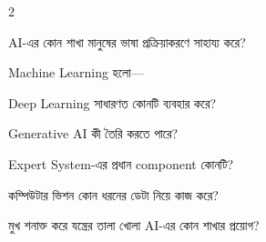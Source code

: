 \begin{topicbody}
\begin{multicols}{2}
\begin{compactenum}
\item \begin{minipage}[t]{\linewidth}AI-এর কোন শাখা মানুষের ভাষা প্রক্রিয়াকরণে সাহায্য করে?\par {}\par\end{minipage}

\item \begin{minipage}[t]{\linewidth}Machine Learning হলো—\par {}\par\end{minipage}

\item \begin{minipage}[t]{\linewidth}Deep Learning সাধারণত কোনটি ব্যবহার করে?\par {}\par\end{minipage}

\item \begin{minipage}[t]{\linewidth}Generative AI কী তৈরি করতে পারে?\par {}\par\end{minipage}

\item \begin{minipage}[t]{\linewidth}Expert System-এর প্রধান component কোনটি?\par {}\par\end{minipage}

\item \begin{minipage}[t]{\linewidth}কম্পিউটার ভিশন কোন ধরনের ডেটা নিয়ে কাজ করে?\par {}\par\end{minipage}

\item \begin{minipage}[t]{\linewidth}মুখ শনাক্ত করে যন্ত্রের তালা খোলা AI-এর কোন শাখার প্রয়োগ?\par {}\par\end{minipage}


\end{compactenum}
\end{multicols}
\end{topicbody}

